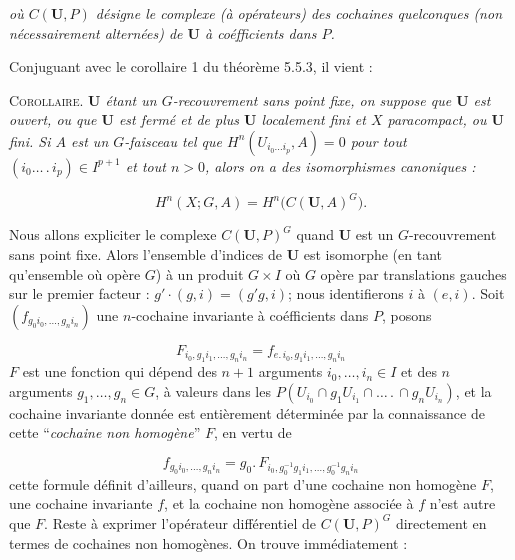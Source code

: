 \clearpage
{}

\noindent\textit{où $C({\mathbf U},P)$ désigne le complexe (à opérateurs) des
cochaines quelconques (non nécessairement alternées) de ${\mathbf U}$ à
coéfficients dans $P$.}

Conjuguant avec le corollaire 1 du théorème 5.5.3, il vient :

\textsc{Corollaire.} \textit{${\mathbf U}$ étant un $G$-recouvrement
sans point fixe, on suppose que ${\mathbf U}$ est ouvert, ou que ${\mathbf U}$
est fermé et de plus ${\mathbf U}$ localement fini et $X$ paracompact, ou ${\mathbf U}$ fini. Si $A$ est un
$G$-faisceau tel que $H^n(U_{i_0\ldots i_p},A)=0$ pour tout
$(i_0\ldots\,.\,i_p)\in I^{p+1}$ et tout $n>0$, alors on a des isomorphismes
canoniques :}

\[
H^n(X;G,A)=H^n\bigl(C({\mathbf U},A)^G\bigr).
\]

Nous allons expliciter le complexe $C({\mathbf U},P)^G$ quand ${\mathbf U}$ est
un $G$-recouvrement sans point fixe. Alors l'ensemble d'indices de
${\mathbf U}$ est isomorphe (en tant qu'ensemble où opère $G$) à un produit
$G\times I$ où $G$ opère par translations gauches sur le premier facteur :
$g'\cdot(g,i)=(g'g,i)$; nous identifierons $i$ à $(e,i)$. Soit
$(f_{g_0i_0,\ldots,g_ni_n})$ une $n$-cochaine invariante à coéfficients dans
$P$, posons

\[
\tag{5.5.9}
F_{i_0,g_1i_1,\ldots,g_ni_n}
=f_{e.\,i_0,g_1i_1,\ldots,g_ni_n}
\]
$F$ est une fonction qui dépend des $n+1$ arguments $i_0,\ldots,i_n\in I$ et
des $n$ arguments $g_1,\ldots,g_n\in G$, à valeurs dans les
$P(U_{i_0}\cap g_1U_{i_1}\cap\ldots\,.\,\cap g_nU_{i_n})$, et la cochaine
invariante donnée est entièrement déterminée par la connaissance de cette
``\emph{cochaine non homogène}'' $F$, en vertu de

\[
\tag{5.5.10}
f_{g_0i_0,\ldots,g_ni_n}
=g_0.\,F_{i_0,g_0^{-1}g_1i_1,\ldots,g_0^{-1}g_ni_n}
\]
cette formule définit d'ailleurs, quand on part d'une cochaine non homogène
$F$, une cochaine invariante $f$, et la cochaine non homogène associée à $f$
n'est autre que $F$. Reste à exprimer l'opérateur différentiel de
$C({\mathbf U},P)^G$ directement en termes de cochaines non homogènes. On trouve
immédiatement :

